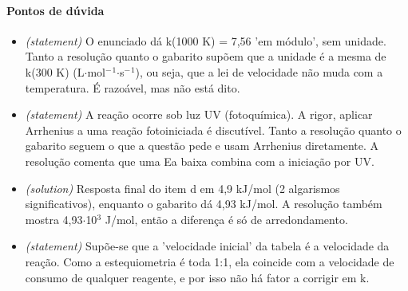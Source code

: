\documentclass{article}%
\begin{document}
\paragraph{Pontos de dúvida}%
\begin{itemize}%
\item%
\textit{(statement)} O enunciado dá k(1000 K) = 7,56 'em módulo', sem unidade. Tanto a resolução quanto o gabarito supõem que a unidade é a mesma de k(300 K) (L$\cdot$mol$^{-}$$^{1}$$\cdot$s$^{-}$$^{1}$), ou seja, que a lei de velocidade não muda com a temperatura. É razoável, mas não está dito.%
\item%
\textit{(statement)} A reação ocorre sob luz UV (fotoquímica). A rigor, aplicar Arrhenius a uma reação fotoiniciada é discutível. Tanto a resolução quanto o gabarito seguem o que a questão pede e usam Arrhenius diretamente. A resolução comenta que uma Ea baixa combina com a iniciação por UV.%
\item%
\textit{(solution)} Resposta final do item d em 4,9 kJ/mol (2 algarismos significativos), enquanto o gabarito dá 4,93 kJ/mol. A resolução também mostra 4,93$\cdot$10$^3$ J/mol, então a diferença é só de arredondamento.%
\item%
\textit{(statement)} Supõe{-}se que a 'velocidade inicial' da tabela é a velocidade da reação. Como a estequiometria é toda 1:1, ela coincide com a velocidade de consumo de qualquer reagente, e por isso não há fator a corrigir em k.%
\end{itemize}%
\end{document}
